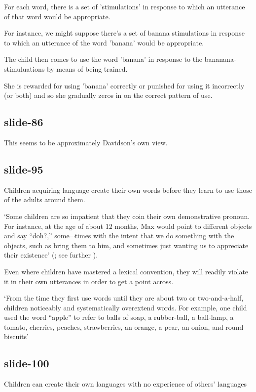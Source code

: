 \documentclass[12pt,\papersize]{extarticle}
\begin{document}
For each word, there is a set of 'stimulations' in response to which an utterance of that word would be appropriate.

For instance, we might suppose there's a set of banana stimulations in response to which an utterance of the word 'banana' would be appropriate.

The child then comes to use the word 'banana' in response to the bananana-stimuluations by means of being trained.

She is rewarded for using 'banana' correctly or punished for using it incorrectly (or both) and so she gradually zeros in on the correct pattern of use.

\subsection{slide-86}
This seems to be approximately Davidson's own view.

\subsection{slide-95}
Children acquiring language create their own words before they learn to use those of the adults
around them.

‘Some children are so impatient that they coin their own demonstrative pronoun. For
instance, at the age of about 12 months, Max would point to different objects and say
“doh?,” some¬times with the intent that we do something with the objects, such as bring
them to him, and sometimes just wanting us to appreciate their existence’
(\citealp[p.\ 122]{Bloom:2000qz}; see further \citealp{Clark:1981bi,Clark:1982hj}).

Even where children have mastered a lexical convention, they will readily violate it in
their own utterances in order to get a point across.

‘From the time they first use words until they are about two or two-and-a-half,
children noticeably and systematically overextend words. For example, one child used
the word “apple” to refer to balls of soap, a rubber-ball, a ball-lamp, a tomato,
cherries, peaches, strawberries, an orange, a pear, an onion, and round biscuits’
\citep[p.\ 35]{Clark:1993bv}

\subsection{slide-100}
Children can create their own languages
with no experience of others' languages
\end{document}
